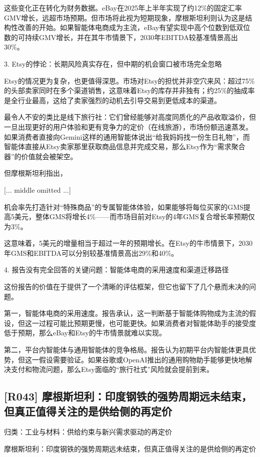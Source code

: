 \documentclass[11pt]{ctexart}
\begin{document}
这些变化正在转化为财务数据。eBay在2025年上半年实现了约12\%的固定汇率GMV增长，远超市场预期。但市场将此视为短期现象，摩根斯坦利则认为这是结构性改善的开始。如果智能体电商成为主流，eBay有望实现中高个位数到低双位数的可持续GMV增长，并在其牛市情景下，2030年EBITDA较基准情景高出30\%。

3. Etsy的悖论：长期风险真实存在，但中期的机会窗口被市场完全忽略

Etsy的情况更为复杂，也更值得深思。市场对Etsy的担忧并非空穴来风：超过75\%的头部卖家同时在多个渠道销售，这意味着Etsy的库存并非独有；约25\%的抽成率是全行业最高，这给了卖家强烈的动机去引导交易到更低成本的渠道。

最令人不安的类比是线下旅行社：它们曾经能够对高度同质化的产品收取溢价，但一旦出现更好的用户体验和更有竞争力的定价（在线旅游），市场份额迅速蒸发。如果消费者直接向Gemini这样的通用智能体说出“给我妈妈找一份生日礼物”，而智能体直接从Etsy卖家那里获取商品信息并完成交易，那么Etsy作为“需求聚合器”的价值就会被架空。

但摩根斯坦利指出，

[... middle omitted ...]

机会率先打造针对“特殊商品”的专属智能体体验，如果能够将每位买家的GMS提高5美元，整体GMS将增长4\%——而市场目前对Etsy的4年GMS复合增长率预期仅为3\%。

这意味着，5美元的增量相当于超过一年的预期增长。在Etsy的牛市情景下，2030年GMS和EBITDA可以分别较基准情景高出29\%和40\%。

4. 报告没有完全回答的关键问题：智能体电商的采用速度和渠道迁移路径

这份报告的价值在于提供了一个清晰的评估框架，但它也留下了几个悬而未决的问题。

第一，智能体电商的采用速度。报告承认，这一判断基于智能体购物成为主流的假设，但这一过程可能比预期更慢，也可能更快。如果消费者对智能体助手的接受度低于预期，那么eBay和Etsy的牛市情景就难以实现。

第二，平台内智能体与通用智能体的竞争格局。报告认为初期平台内智能体更具优势，但这一假设需要验证。如果谷歌或OpenAI推出的通用购物助手能够更快地解决支付和物流问题，那么Etsy面临的“旅行社式”风险就会提前到来。

\subsection{[R043] 摩根斯坦利：印度钢铁的强势周期远未结束，但真正值得关注的是供给侧的再定价}
{\small\color{refgray}归类：工业与材料：供给约束与新兴需求驱动的再定价}

摩根斯坦利：印度钢铁的强势周期远未结束，但真正值得关注的是供给侧的再定价
\end{document}
